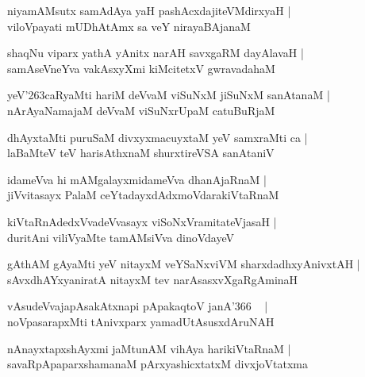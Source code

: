 \documentclass[twoside,12pt,openright]{book}
\def\S{\char'263}
\newcounter{shloka}[chapter]
\begin{document}
\begin{shloka}%
niyamAMsutx samAdAya yaH pashAcxdajiteVMdirxyaH |\\
viloVpayati mUDhAtAmx sa veY nirayaBAjanaM 
\end{shloka}

\begin{shloka}%
shaqNu viparx yathA yAnitx narAH savxgaRM dayAlavaH |\\
samAseVneYva vakAsxyXmi kiMcitetxV gwravadahaM 
\end{shloka}

\begin{shloka}%
yeV\S caRyaMti hariM deVvaM viSuNxM jiSuNxM sanAtanaM |\\
nArAyaNamajaM deVvaM viSuNxrUpaM catuBuRjaM
\end{shloka}

\begin{shloka}%
dhAyxtaMti puruSaM divxyxmacuyxtaM yeV samxraMti ca |\\
laBaMteV teV harisAthxnaM shurxtireVSA sanAtaniV
\end{shloka}

\begin{shloka}%
idameVva hi mAMgalayxmidameVva dhanAjaRnaM |\\
jiVvitasayx PalaM ceYtadayxdAdxmoVdarakiVtaRnaM 
\end{shloka}

\begin{shloka}%
kiVtaRnAdedxVvadeVvasayx viSoNxVramitateVjasaH |\\
duritAni viliVyaMte tamAMsiVva dinoVdayeV 
\end{shloka}

\begin{shloka}%
gAthAM gAyaMti yeV nitayxM veYSaNxviVM sharxdadhxyAnivxtAH |\\
sAvxdhAYxyaniratA nitayxM tev narAsasxvXgaRgAminaH 
\end{shloka}

\begin{shloka}%
vAsudeVvajapAsakAtxnapi pApakaqtoV janA\char'366 ~ |\\
noVpasarapxMti tAnivxparx yamadUtAsusxdAruNAH 
\end{shloka}

\begin{shloka}%
nAnayxtapxshAyxmi jaMtunAM vihAya harikiVtaRnaM |\\
savaRpApaparxshamanaM pArxyashicxtatxM divxjoVtatxma
\end{shloka}
\end{document}
